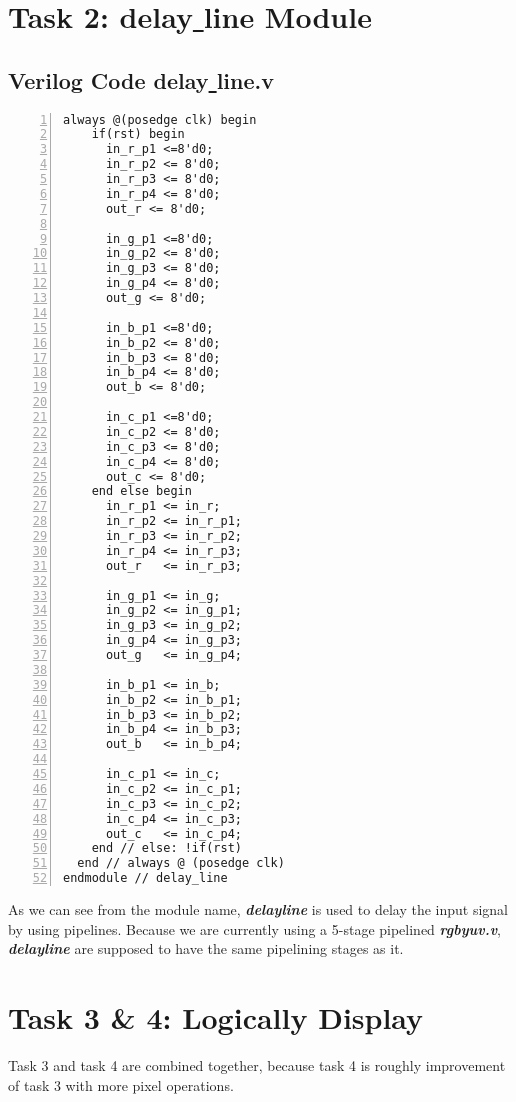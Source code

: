 \documentclass[12pt,fleqn]{article}
\begin{document}
\section{Task 2: delay\underline{ }line Module}
\label{sec:task2}
\subsection{Verilog Code delay\underline{ }line.v}
{\linespread{0.75}
\begin{lstlisting}[numbers=left,multicols=2]
always @(posedge clk) begin
    if(rst) begin
      in_r_p1 <=8'd0;
      in_r_p2 <= 8'd0;
      in_r_p3 <= 8'd0;
      in_r_p4 <= 8'd0;
      out_r <= 8'd0;
      
      in_g_p1 <=8'd0;
      in_g_p2 <= 8'd0;
      in_g_p3 <= 8'd0;
      in_g_p4 <= 8'd0;
      out_g <= 8'd0;
      
      in_b_p1 <=8'd0;
      in_b_p2 <= 8'd0;
      in_b_p3 <= 8'd0;
      in_b_p4 <= 8'd0;
      out_b <= 8'd0;
      
      in_c_p1 <=8'd0;
      in_c_p2 <= 8'd0;
      in_c_p3 <= 8'd0;
      in_c_p4 <= 8'd0;
      out_c <= 8'd0;
    end else begin
      in_r_p1 <= in_r;
      in_r_p2 <= in_r_p1;
      in_r_p3 <= in_r_p2;
      in_r_p4 <= in_r_p3;
      out_r   <= in_r_p3;
		  
      in_g_p1 <= in_g;
      in_g_p2 <= in_g_p1;
      in_g_p3 <= in_g_p2;
      in_g_p4 <= in_g_p3;
      out_g   <= in_g_p4;
      
      in_b_p1 <= in_b;
      in_b_p2 <= in_b_p1;
      in_b_p3 <= in_b_p2;
      in_b_p4 <= in_b_p3;
      out_b   <= in_b_p4;
      
      in_c_p1 <= in_c;
      in_c_p2 <= in_c_p1;
      in_c_p3 <= in_c_p2;
      in_c_p4 <= in_c_p3;
      out_c   <= in_c_p4;
    end // else: !if(rst)
  end // always @ (posedge clk)
endmodule // delay_line
\end{lstlisting}
\par}
As we can see from the module name, \textbf{\emph{delay\underline{}line}} is used to delay the input signal by using pipelines. Because we are currently using a 5-stage pipelined \textbf{\emph{rgbyuv.v}}, \textbf{\emph{delay\underline{}line}} are supposed to have the same pipelining stages as it.

\section{Task 3 \& 4: Logically Display}
\label{sec:task34}
Task 3 and task 4 are combined together, because task 4 is roughly improvement of task 3 with more pixel operations.
\end{document}

